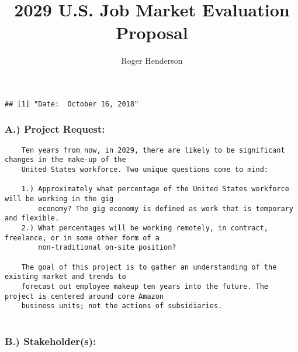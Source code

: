 \documentclass[]{article}
\title{2029 U.S. Job Market Evaluation Proposal}
\author{Roger Henderson}
\date{}
\begin{document}
\maketitle

\begin{verbatim}
## [1] "Date:  October 16, 2018"
\end{verbatim}

\subsubsection{A.) Project Request:}\label{a.-project-request}

\begin{verbatim}
    Ten years from now, in 2029, there are likely to be significant changes in the make-up of the 
    United States workforce. Two unique questions come to mind:
    
    1.) Approximately what percentage of the United States workforce will be working in the gig 
        economy? The gig economy is defined as work that is temporary and flexible.
    2.) What percentages will be working remotely, in contract, freelance, or in some other form of a 
        non-traditional on-site position?
        
    The goal of this project is to gather an understanding of the existing market and trends to 
    forecast out employee makeup ten years into the future. The project is centered around core Amazon 
    business units; not the actions of subsidiaries.
    
\end{verbatim}

\subsubsection{B.) Stakeholder(s):}\label{b.-stakeholders}
\end{document}
